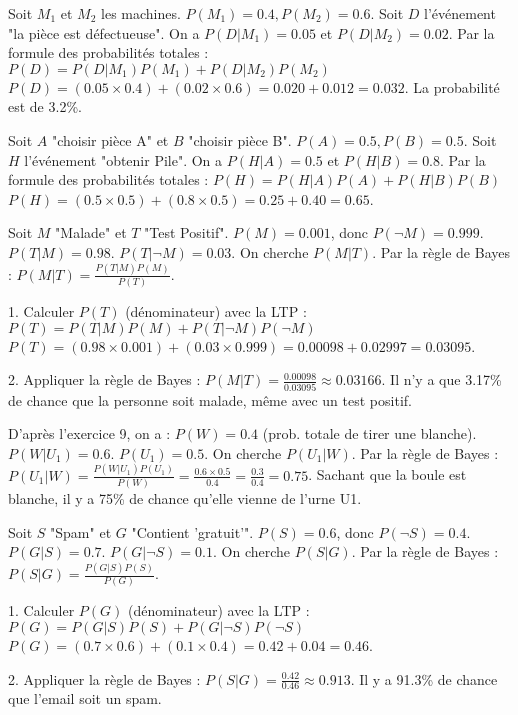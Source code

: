 \begin{correctionbox}
Soit $M_1$ et $M_2$ les machines. $P(M_1)=0.4, P(M_2)=0.6$.
Soit $D$ l'événement "la pièce est défectueuse".
On a $P(D|M_1) = 0.05$ et $P(D|M_2) = 0.02$.
Par la formule des probabilités totales :
$P(D) = P(D|M_1)P(M_1) + P(D|M_2)P(M_2)$
$P(D) = (0.05 \times 0.4) + (0.02 \times 0.6) = 0.020 + 0.012 = 0.032$.
La probabilité est de 3.2\%.
\end{correctionbox}

\begin{correctionbox}
Soit $A$ "choisir pièce A" et $B$ "choisir pièce B". $P(A)=0.5, P(B)=0.5$.
Soit $H$ l'événement "obtenir Pile".
On a $P(H|A) = 0.5$ et $P(H|B) = 0.8$.
Par la formule des probabilités totales :
$P(H) = P(H|A)P(A) + P(H|B)P(B)$
$P(H) = (0.5 \times 0.5) + (0.8 \times 0.5) = 0.25 + 0.40 = 0.65$.
\end{correctionbox}


\begin{correctionbox}
Soit $M$ "Malade" et $T$ "Test Positif".
$P(M) = 0.001$, donc $P(\neg M) = 0.999$.
$P(T|M) = 0.98$.
$P(T|\neg M) = 0.03$.
On cherche $P(M|T)$. Par la règle de Bayes : $P(M|T) = \frac{P(T|M)P(M)}{P(T)}$.

1.  Calculer $P(T)$ (dénominateur) avec la LTP :
    $P(T) = P(T|M)P(M) + P(T|\neg M)P(\neg M)$
    $P(T) = (0.98 \times 0.001) + (0.03 \times 0.999) = 0.00098 + 0.02997 = 0.03095$.

2.  Appliquer la règle de Bayes :
    $P(M|T) = \frac{0.00098}{0.03095} \approx 0.03166$.
    Il n'y a que 3.17\% de chance que la personne soit malade, même avec un test positif.
\end{correctionbox}

\begin{correctionbox}
D'après l'exercice 9, on a :
$P(W) = 0.4$ (prob. totale de tirer une blanche).
$P(W|U_1) = 0.6$.
$P(U_1) = 0.5$.
On cherche $P(U_1|W)$. Par la règle de Bayes :
$P(U_1|W) = \frac{P(W|U_1)P(U_1)}{P(W)} = \frac{0.6 \times 0.5}{0.4} = \frac{0.3}{0.4} = 0.75$.
Sachant que la boule est blanche, il y a 75\% de chance qu'elle vienne de l'urne U1.
\end{correctionbox}

\begin{correctionbox}
Soit $S$ "Spam" et $G$ "Contient 'gratuit'".
$P(S) = 0.6$, donc $P(\neg S) = 0.4$.
$P(G|S) = 0.7$.
$P(G|\neg S) = 0.1$.
On cherche $P(S|G)$. Par la règle de Bayes : $P(S|G) = \frac{P(G|S)P(S)}{P(G)}$.

1.  Calculer $P(G)$ (dénominateur) avec la LTP :
    $P(G) = P(G|S)P(S) + P(G|\neg S)P(\neg S)$
    $P(G) = (0.7 \times 0.6) + (0.1 \times 0.4) = 0.42 + 0.04 = 0.46$.

2.  Appliquer la règle de Bayes :
    $P(S|G) = \frac{0.42}{0.46} \approx 0.913$.
    Il y a 91.3\% de chance que l'email soit un spam.
\end{correctionbox}

